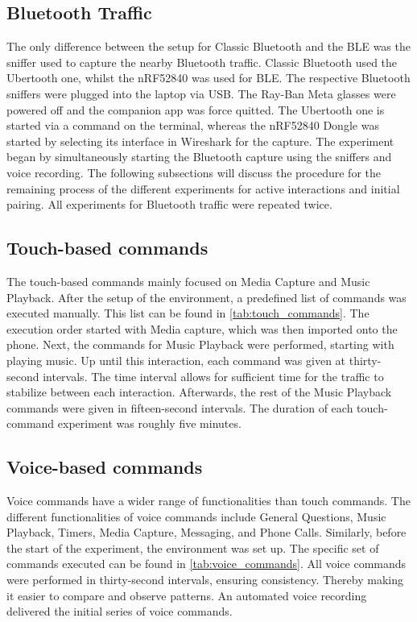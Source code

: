 \subsection*{Bluetooth Traffic}
The only difference between the setup for Classic Bluetooth and the BLE was the sniffer used to capture the nearby Bluetooth traffic. Classic Bluetooth used the Ubertooth one, whilst the nRF52840 was used for BLE. The respective Bluetooth sniffers were plugged into the laptop via USB. The Ray-Ban Meta glasses were powered off and the companion app was force quitted. The Ubertooth one is started via a command on the terminal, whereas the nRF52840 Dongle was started by selecting its interface in Wireshark for the capture. The experiment began by simultaneously starting the Bluetooth capture using the sniffers and voice recording. The following subsections will discuss the procedure for the remaining process of the different experiments for active interactions and initial pairing. All experiments for Bluetooth traffic were repeated twice.

\subsection*{Touch-based commands}
The touch-based commands mainly focused on Media Capture and Music Playback. After the setup of the environment, a predefined list of commands was executed manually. This list can be found in \cref{tab:touch_commands}. 
The execution order started with Media capture, which was then imported onto the phone. Next, the commands for Music Playback were performed, starting with playing music. Up until this interaction, each command was given at thirty-second intervals. The time interval allows for sufficient time for the traffic to stabilize between each interaction. Afterwards, the rest of the Music Playback commands were given in fifteen-second intervals. The duration of each touch-command experiment was roughly five minutes.

\subsection*{Voice-based commands}
Voice commands have a wider range of functionalities than touch commands. The different functionalities of voice commands include General Questions, Music Playback, Timers, Media Capture, Messaging, and Phone Calls. Similarly, before the start of the experiment, the environment was set up. The specific set of commands executed can be found in \cref{tab:voice_commands}. All voice commands were performed in thirty-second intervals, ensuring consistency. Thereby making it easier to compare and observe patterns. An automated voice recording delivered the initial series of voice commands.

